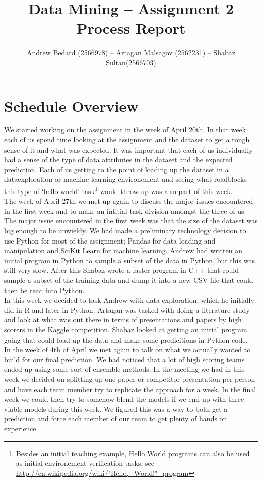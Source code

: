 \documentclass{llncs}
\title{Data Mining -- Assignment 2 Process Report}
\author{Andrew Bedard (2566978) -- Artagan Malsagov (2562231)  -- Shabaz Sultan(2566703)}
\institute{}
\begin{document}
\maketitle
\section{Schedule Overview}
We started working on the assignment in the week of April 20th. In that week each of us spend time looking at the assignment and the dataset to get a rough sense of it and what was expected. It was important that each of us individually had a sense of the type of data attributes in the dataset and the expected prediction. Each of us getting to the point of loading up the dataset in a dataexploration or machine learning environement and seeing what roadblocks this type of `hello world' task\footnote{Besides an initial teaching example, Hello World programs can also be used as initial environement verification tasks, see \url{http://en.wikipedia.org/wiki/"Hello,_World!"_program}} would throw up was also part of this week.\\
The week of April 27th we met up again to discuss the major issues encountered in the first week and to make an intitial task division amongst the three of us. The major issue encountered in the first week was that the size of the dataset was big enough to be unwieldy. We had made a preliminary technology decision to use Python for most of the assignment; Pandas for data loading and manipulation and SciKit Learn for machine learning. Andrew had written an initial program in Python to sample a subset of the data in Python, but this was still very slow. After this Shabaz wrote a faster program in C++ that could sample a subset of the training data and dump it into a new CSV file that could then be read into Python.\\
In this week we decided to task Andrew with data exploration, which he initially did in R and later in Python. Artagan was tasked with doing a literature study and look at what was out there in terms of presentations and papers by high scorers in the Kaggle competition. Shabaz looked at getting an initial program going that could load up the data and make some predicitions in Python code.\\
In the week of 4th of April we met again to talk on what we actually wanted to build for our final prediction. We had noticed that a lot of high scoring teams ended up using some sort of ensemble methods. In the meeting we had in this week we decided on splitting up one paper or competitor presentation per person and have each team member try to replicate the approach for a week. In the final week we could then try to somehow blend the models if we end up with three viable models during this week. We figured this was a way to both get a prediction and force each member of our team to get plenty of hands on experience.\\
\end{document}

